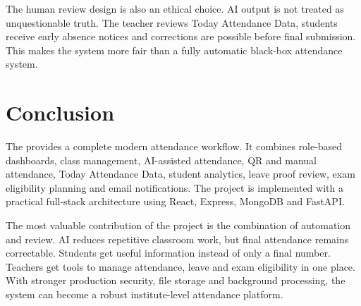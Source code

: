 The human review design is also an ethical choice. AI output is not treated as unquestionable truth. The teacher reviews Today Attendance Data, students receive early absence notices and corrections are possible before final submission. This makes the system more fair than a fully automatic black-box attendance system.

\section{Conclusion}

The \projecttitle{} provides a complete modern attendance workflow. It combines role-based dashboards, class management, AI-assisted attendance, QR and manual attendance, Today Attendance Data, student analytics, leave proof review, exam eligibility planning and email notifications. The project is implemented with a practical full-stack architecture using React, Express, MongoDB and FastAPI.

The most valuable contribution of the project is the combination of automation and review. AI reduces repetitive classroom work, but final attendance remains correctable. Students get useful information instead of only a final number. Teachers get tools to manage attendance, leave and exam eligibility in one place. With stronger production security, file storage and background processing, the system can become a robust institute-level attendance platform.
